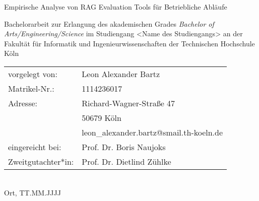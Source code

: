 \begin{titlepage}
%
\sffamily%
%
\begin{center}
\end{center}
%
\vfill
%
\begin{huge}
Empirische Analyse von RAG Evaluation Tools für Betriebliche Abläufe\\[10mm]
\end{huge}
%
Bachelorarbeit zur Erlangung des akademischen Grades\newline
\emph{Bachelor of Arts/Engineering/Science}\newline
im Studiengang <Name des Studiengangs>\newline
an der Fakultät für Informatik und Ingenieurwissenschaften\newline
der Technischen Hochschule Köln
%
\vfill
%
\begin{tabular}{@{}ll}
vorgelegt von: & Leon Alexander Bartz\\
Matrikel-Nr.:  & 1114236017\\
Adresse:       & Richard-Wagner-Straße 47\\
               & 50679 Köln\\
               & leon\_alexander.bartz@smail.th-koeln.de\\[5mm]
eingereicht bei:   & Prof. Dr. Boris Naujoks\\
Zweitgutachter*in: & Prof. Dr. Dietlind Zühlke
\end{tabular}	
%
\\[10mm]
%
Ort, TT.MM.JJJJ%
%
\rmfamily%
%
\end{titlepage}